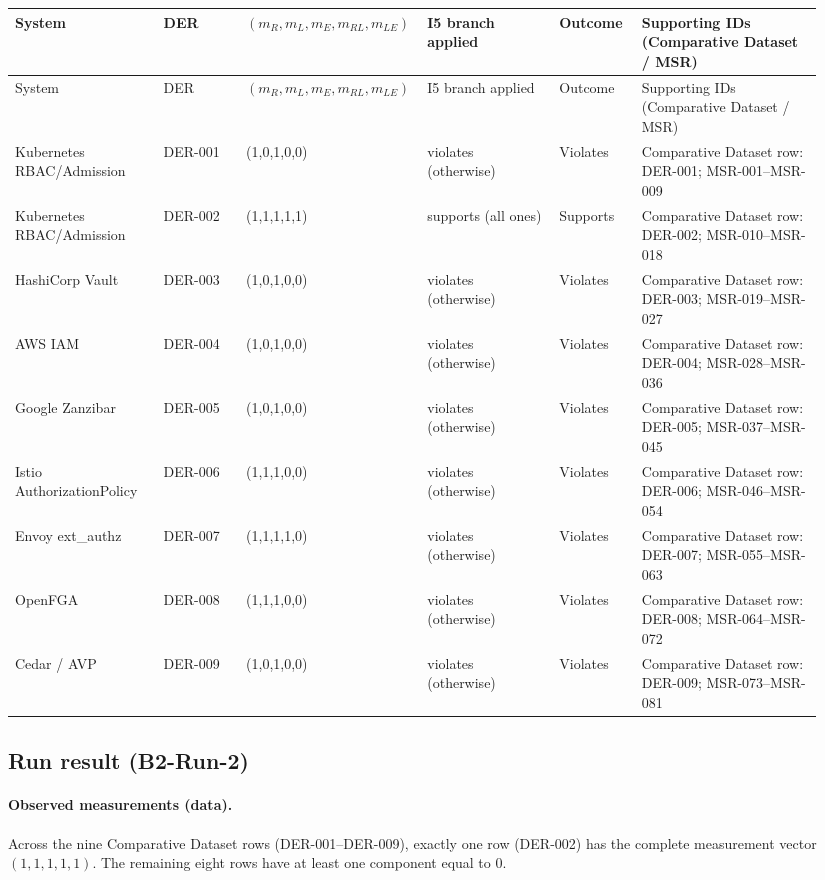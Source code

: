 \begin{center}
\begin{longtable}{@{}p{0.18\linewidth}p{0.10\linewidth}p{0.18\linewidth}p{0.16\linewidth}p{0.10\linewidth}p{0.22\linewidth}@{}}
\toprule
System & DER & $(m_R,m_L,m_E,m_{RL},m_{LE})$ & I5 branch applied & Outcome & Supporting IDs (Comparative Dataset / MSR) \\
\midrule
\endfirsthead
\toprule
System & DER & $(m_R,m_L,m_E,m_{RL},m_{LE})$ & I5 branch applied & Outcome & Supporting IDs (Comparative Dataset / MSR) \\
\midrule
\endhead
\bottomrule
\endfoot
\bottomrule
\endlastfoot
Kubernetes RBAC/Admission & DER-001 & (1,0,1,0,0) & violates (otherwise) & Violates & Comparative Dataset row: DER-001; MSR-001--MSR-009\\
Kubernetes RBAC/Admission & DER-002 & (1,1,1,1,1) & supports (all ones) & Supports & Comparative Dataset row: DER-002; MSR-010--MSR-018\\
HashiCorp Vault & DER-003 & (1,0,1,0,0) & violates (otherwise) & Violates & Comparative Dataset row: DER-003; MSR-019--MSR-027\\
AWS IAM & DER-004 & (1,0,1,0,0) & violates (otherwise) & Violates & Comparative Dataset row: DER-004; MSR-028--MSR-036\\
Google Zanzibar & DER-005 & (1,0,1,0,0) & violates (otherwise) & Violates & Comparative Dataset row: DER-005; MSR-037--MSR-045\\
Istio AuthorizationPolicy & DER-006 & (1,1,1,0,0) & violates (otherwise) & Violates & Comparative Dataset row: DER-006; MSR-046--MSR-054\\
Envoy ext\_authz & DER-007 & (1,1,1,1,0) & violates (otherwise) & Violates & Comparative Dataset row: DER-007; MSR-055--MSR-063\\
OpenFGA & DER-008 & (1,1,1,0,0) & violates (otherwise) & Violates & Comparative Dataset row: DER-008; MSR-064--MSR-072\\
Cedar / AVP & DER-009 & (1,0,1,0,0) & violates (otherwise) & Violates & Comparative Dataset row: DER-009; MSR-073--MSR-081\\
\end{longtable}
\end{center}

\subsection{Run result (B2-Run-2)}
\paragraph{Observed measurements (data).}
Across the nine Comparative Dataset rows (DER-001--DER-009), exactly one row (DER-002) has the complete measurement vector $(1,1,1,1,1)$. The remaining eight rows have at least one component equal to 0.

